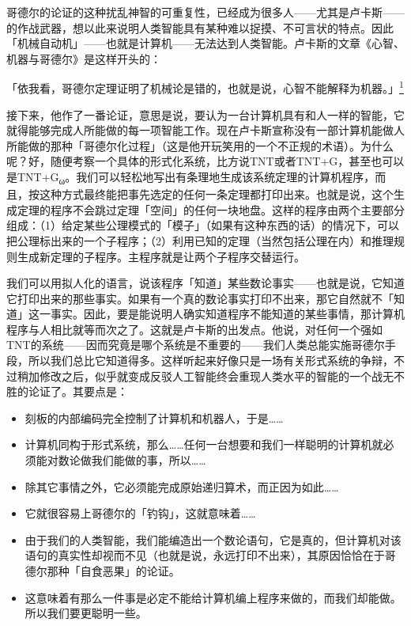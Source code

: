 \documentclass[
  12pt,
  twoside,
  openright,
  oldfontcommands,
]{memoir}
\providecommand{\tightlist}{%
  \setlength{\itemsep}{0pt}\setlength{\parskip}{0pt}}
\begin{document}
哥德尔的论证的这种扰乱神智的可重复性，已经成为很多人------尤其是卢卡斯------的作战武器，想以此来说明人类智能具有某种难以捉摸、不可言状的特点。因此「机械自动机」------也就是计算机------无法达到人类智能。卢卡斯的文章《心智、机器与哥德尔》是这样开头的：

「依我看，哥德尔定理证明了机械论是错的，也就是说，心智不能解释为机器。」\hyperref[fn:Chapter15-1]{\textsuperscript{1}}

接下来，他作了一番论证，意思是说，要认为一台计算机具有和人一样的智能，它就得能够完成人所能做的每一项智能工作。现在卢卡斯宣称没有一部计算机能做人所能做的那种「哥德尔化过程」（这是他开玩笑用的一个不正规的术语）。为什么呢？好，随便考察一个具体的形式化系统，比方说TNT或者TNT+G，甚至也可以是TNT+G\textsubscript{ω}。我们可以轻松地写出有条理地生成该系统定理的计算机程序，而且，按这种方式最终能把事先选定的任何一条定理都打印出来。也就是说，这个生成定理的程序不会跳过定理「空间」的任何一块地盘。这样的程序由两个主要部分组成：（1）给定某些公理模式的「模子」（如果有这种东西的话）的情况下，可以把公理标出来的一个子程序；（2）利用已知的定理（当然包括公理在内）和推理规则生成新定理的子程序。主程序就是让两个子程序交替运行。

我们可以用拟人化的语言，说该程序「知道」某些数论事实------也就是说，它知道它打印出来的那些事实。如果有一个真的数论事实打印不出来，那它自然就不「知道」这一事实。因此，要是能说明人确实知道程序不能知道的某些事情，那计算机程序与人相比就等而次之了。这就是卢卡斯的出发点。他说，对任何一个强如TNT的系统------因而究竟是哪个系统是不重要的------我们人类总能实施哥德尔手段，所以我们总比它知道得多。这样听起来好像只是一场有关形式系统的争辩，不过稍加修改之后，似乎就变成反驳人工智能终会重现人类水平的智能的一个战无不胜的论证了。其要点是：

\begin{itemize}
\tightlist
\item
  刻板的内部编码完全控制了计算机和机器人，于是\ldots\ldots{}
\item
  计算机同构于形式系统，那么\ldots\ldots 任何一台想要和我们一样聪明的计算机就必须能对数论做我们能做的事，所以\ldots\ldots{}
\item
  除其它事情之外，它必须能完成原始递归算术，而正因为如此\ldots\ldots{}
\item
  它就很容易上哥德尔的「钓钩」，这就意味着\ldots\ldots{}
\item
  由于我们的人类智能，我们能编造出一个数论语句，它是真的，但计算机对该语句的真实性却视而不见（也就是说，永远打印不出来），其原因恰恰在于哥德尔那种「自食恶果」的论证。
\item
  这意味着有那么一件事是必定不能给计算机编上程序来做的，而我们却能做。所以我们要更聪明一些。
\end{itemize}
\end{document}
